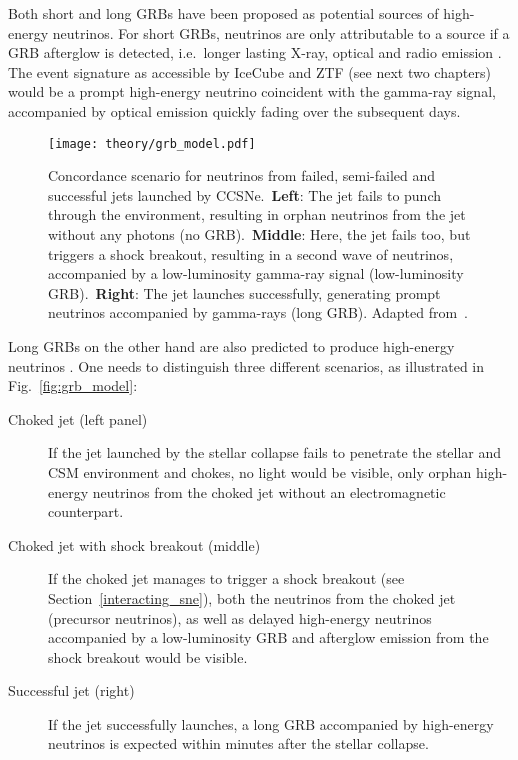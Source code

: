Both short and long GRBs have been proposed as potential sources of high-energy neutrinos. For short GRBs, neutrinos are only attributable to a source if a GRB afterglow is detected, i.e.\ longer lasting X-ray, optical and radio emission . The event signature as accessible by IceCube and ZTF (see next two chapters) would be a prompt high-energy neutrino coincident with the gamma-ray signal, accompanied by optical emission quickly fading over the subsequent days.

\begin{figure}[htb]
    \texttt{[image: theory/grb\_model.pdf]}
    \caption[High-energy neutrinos from GRBs]{Concordance scenario for neutrinos from failed, semi-failed and successful jets launched by CCSNe.\ \textbf{Left}: The jet fails to punch through the environment, resulting in orphan neutrinos from the jet without any photons (no GRB).\ \textbf{Middle}: Here, the jet fails too, but triggers a shock breakout, resulting in a second wave of neutrinos, accompanied by a low-luminosity gamma-ray signal (low-luminosity GRB).\ \textbf{Right}: The jet launches successfully, generating prompt neutrinos accompanied by gamma-rays (long GRB). Adapted from~\cite{Senno2016}.}
\end{figure}

Long GRBs on the other hand are also predicted to produce high-energy neutrinos . One needs to distinguish three different scenarios, as illustrated in Fig.~\ref{fig:grb_model}:
\begin{description}
    \item[Choked jet (left panel)] If the jet launched by the stellar collapse fails to penetrate the stellar and CSM environment and chokes, no light would be visible, only orphan high-energy neutrinos from the choked jet without an electromagnetic counterpart.
    \item[Choked jet with shock breakout (middle)] If the choked jet manages to trigger a shock breakout (see Section~\ref{interacting_sne}), both the neutrinos from the choked jet (precursor neutrinos), as well as delayed high-energy neutrinos accompanied by a low-luminosity GRB and afterglow emission from the shock breakout would be visible.
    \item[Successful jet (right)] If the jet successfully launches, a long GRB accompanied by high-energy neutrinos is expected within minutes after the stellar collapse.
\end{description}

